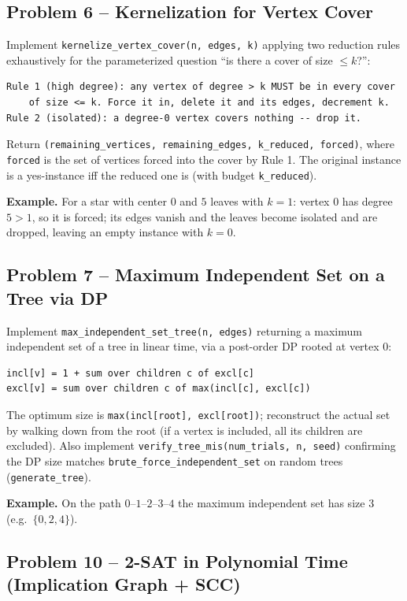 \documentclass[11pt]{article}
\begin{document}
\subsection*{Problem 6 -- Kernelization for Vertex Cover}

Implement \texttt{kernelize\_vertex\_cover(n, edges, k)} applying two reduction
rules exhaustively for the parameterized question ``is there a cover of size
$\le k$?'':
\begin{verbatim}
Rule 1 (high degree): any vertex of degree > k MUST be in every cover
    of size <= k. Force it in, delete it and its edges, decrement k.
Rule 2 (isolated): a degree-0 vertex covers nothing -- drop it.
\end{verbatim}
Return \texttt{(remaining\_vertices, remaining\_edges, k\_reduced, forced)},
where \texttt{forced} is the set of vertices forced into the cover by Rule 1.
The original instance is a yes-instance iff the reduced one is (with budget
\texttt{k\_reduced}).

\textbf{Example.} For a star with center $0$ and $5$ leaves with $k=1$: vertex
$0$ has degree $5 > 1$, so it is forced; its edges vanish and the leaves become
isolated and are dropped, leaving an empty instance with $k=0$.

\subsection*{Problem 7 -- Maximum Independent Set on a Tree via DP}

Implement \texttt{max\_independent\_set\_tree(n, edges)} returning a maximum
independent set of a tree in linear time, via a post-order DP rooted at vertex
$0$:
\begin{verbatim}
incl[v] = 1 + sum over children c of excl[c]
excl[v] = sum over children c of max(incl[c], excl[c])
\end{verbatim}
The optimum size is \texttt{max(incl[root], excl[root])}; reconstruct the actual
set by walking down from the root (if a vertex is included, all its children are
excluded). Also implement \texttt{verify\_tree\_mis(num\_trials, n, seed)}
confirming the DP size matches \texttt{brute\_force\_independent\_set} on random
trees (\texttt{generate\_tree}).

\textbf{Example.} On the path $0$--$1$--$2$--$3$--$4$ the maximum independent set
has size $3$ (e.g.\ $\{0,2,4\}$).

\subsection*{Problem 10 -- 2-SAT in Polynomial Time (Implication Graph + SCC)}
\end{document}
